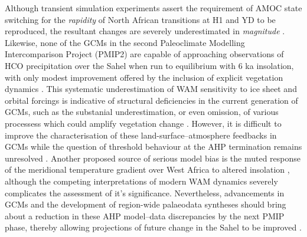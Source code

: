 \documentclass[a4paper]{article}
\begin{document}
Although transient simulation experiments assert the requirement of AMOC state switching for the \emph{rapidity} of North African transitions at H1 and YD to be reproduced, the resultant changes are severely underestimated in \emph{magnitude} \parencite{timm2010mechanisms, otto2014coherent}. 
Likewise, none of the GCMs in the second Paleoclimate Modelling Intercomparison Project (PMIP2) are capable of approaching observations of HCO precipitation over the Sahel when run to equilibrium with 6 ka insolation, with only modest improvement offered by the inclusion of explicit vegetation dynamics \parencite{braconnot2012evaluation, zheng2013characterization, harrison2015evaluation}.
This systematic underestimation of WAM sensitivity to ice sheet and orbital forcings is indicative of structural deficiencies in the current generation of GCMs, such as the substanial underestimation, or even omission, of various processess which could amplify vegetation change \parencite{harrison2015evaluation, tierney2017rainfall}.
However, it is difficult to improve the characterisation of these land-surface--atmosphere feedbacks in GCMs while the question of threshold behaviour at the AHP termination remains unresolved \parencite{claussen2017theory}. 
Another proposed source of serious model bias is the muted response of the meridional temperature gradient over West Africa to altered insolation \parencite{zheng2013characterization}, although the competing interpretations of modern WAM dynamics severely complicates the assessment of it's significance. 
Nevertheless, advancements in GCMs and the development of region-wide palaeodata syntheses should bring about a reduction in these AHP model--data discrepancies by the next PMIP phase, thereby allowing projections of future change in the Sahel to be improved \parencite{braconnot2012evaluation, harrison2015evaluation}.

\end{document}
